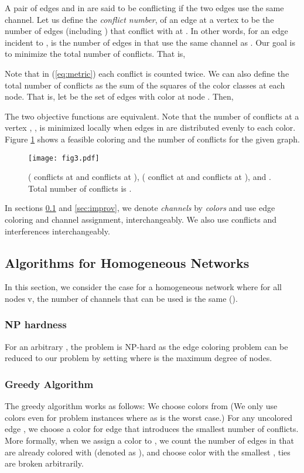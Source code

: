 \documentclass[titlepage, 11pt]{article}
\begin{document}
A pair of edges  and  in  are said to be conflicting
if the two edges use the same channel.
Let us define the {\em conflict number},  of an edge 
 at a vertex  to be the number of edges (including ) that conflict with  at .
In other words, for an edge  incident to ,
 is the number of edges in   that use the same channel as . 
Our goal is to minimize the total number of conflicts. That is, 

Note that in (\ref{eq:metric}) each conflict is counted twice. We can also define the total number of conflicts as the sum of the squares of the color classes at each node.
That is, let  be the set of  edges with color  at node . Then,  

The two objective functions are equivalent.
Note that the number of conflicts at a vertex , , 
is minimized locally when edges in  are distributed evenly to each color.
Figure \ref{fig:cfexample} shows a feasible coloring and  the number of conflicts for the given graph.
\begin{figure}[ht]
\begin{center}
    \centerline{\texttt{[image: fig3.pdf]}}
    \caption{
 ( conflicts at  and  conflicts at ),  ( conflict at  and  conflicts at ),  and .
\newline
Total number of conflicts is .
\label{fig:cfexample}}
\end{center}   
\end{figure} 

In sections \ref{sec:hom} and \ref{sec:improv}, we denote {\em channels} by {\em
colors} and use edge coloring and channel assignment, interchangeably.
We also use conflicts and interferences interchangeably.


\subsection{Algorithms for Homogeneous Networks}
\label{sec:hom}

In this section, we consider the case for a homogeneous network where for all nodes v, the number of channels that can be used is the same (). 
\subsubsection{NP hardness}
\label{sec:np}
For an arbitrary , the problem is NP-hard as the edge coloring problem can be reduced to our problem by setting  where  is the maximum degree of nodes.


\subsubsection{Greedy Algorithm} 
\label{sec:greedy}
The greedy algorithm works as follows:
We choose colors from  
(We only use  colors even for problem instances where  as  is the worst case.) For any  uncolored edge ,
we choose a color for edge  that introduces 
the smallest number of conflicts.
More formally, when we assign a color to ,
we count the number of edges in 
that are already colored with  (denoted as ),
and choose color  with the smallest , ties are broken arbitrarily. 
\end{document}
